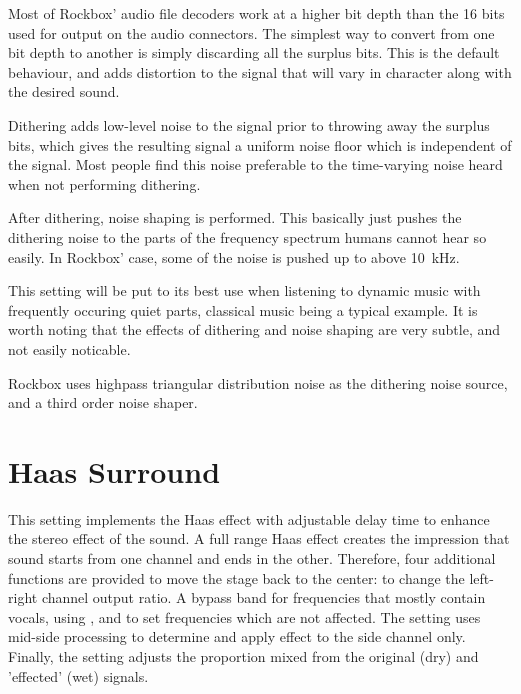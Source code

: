 Most of Rockbox' audio file decoders work at a higher bit depth than the 16 bits
used for output on the \daps{} audio connectors. The simplest way to
convert from one bit depth to another is simply discarding all the surplus bits.
This is the default behaviour, and adds distortion to the signal that will
vary in character along with the desired sound.

Dithering adds low-level noise to the signal prior to throwing away the surplus
bits, which gives the resulting signal a uniform noise floor which is
independent of the signal. Most people find this noise preferable to the
time-varying noise heard when not performing dithering.

After dithering, noise shaping is performed. This basically just pushes the
dithering noise to the parts of the frequency spectrum humans cannot hear so
easily. In Rockbox' case, some of the noise is pushed up to above 10~kHz.

This setting will be put to its best use when listening to dynamic music with
frequently occuring quiet parts, classical music being a typical example. It is
worth noting that the effects of dithering and noise shaping are very subtle,
and not easily noticable.

Rockbox uses highpass triangular distribution noise as the dithering noise
source, and a third order noise shaper.


\section{Haas Surround}
This setting implements the Haas effect with adjustable delay time to enhance
the stereo effect of the sound. A full range Haas effect creates the impression
that sound  starts from one channel and ends in the other.  Therefore, four additional
functions are provided to move the stage back to the center:
 to change the left-right channel output ratio.
A bypass band for frequencies that mostly contain vocals, using ,
and  to set frequencies which are not affected. The 
setting uses mid-side processing to determine and apply effect to the side channel only.
Finally, the  setting adjusts the proportion mixed from the
original (dry) and 'effected' (wet) signals.

